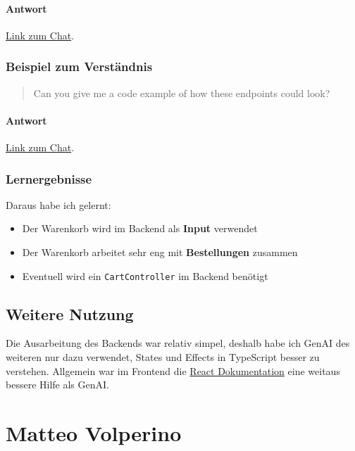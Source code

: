 \documentclass[12pt, a4paper]{scrreprt}
\begin{document}
	\subsubsection{Antwort}

	\href{https://chatgpt.com/s/t_69499ce197148191a4f2e25cf796ae95}{Link zum Chat}.

	\subsection{Beispiel zum Verständnis}

	\begin{quote}
		Can you give me a code example of how these endpoints could look?
	\end{quote}

	\subsubsection{Antwort}

	\href{https://chatgpt.com/s/t_69499ebbed94819190402b415677ac78}{Link zum Chat}.

	\subsection{Lernergebnisse}

	Daraus habe ich gelernt:

	\begin{itemize}
		\item Der Warenkorb wird im Backend als \textbf{Input} verwendet
		\item Der Warenkorb arbeitet sehr eng mit \textbf{Bestellungen} zusammen
		\item Eventuell wird ein \texttt{CartController} im Backend benötigt
	\end{itemize}

	\section{Weitere Nutzung}

	Die Ausarbeitung des Backends war relativ simpel, deshalb habe ich GenAI des weiteren nur dazu verwendet, States und Effects in TypeScript besser zu verstehen. Allgemein war im Frontend die \href{https://primereact.org}{React Dokumentation} eine weitaus bessere Hilfe als GenAI.

	\chapter{Matteo Volperino}
\end{document}
